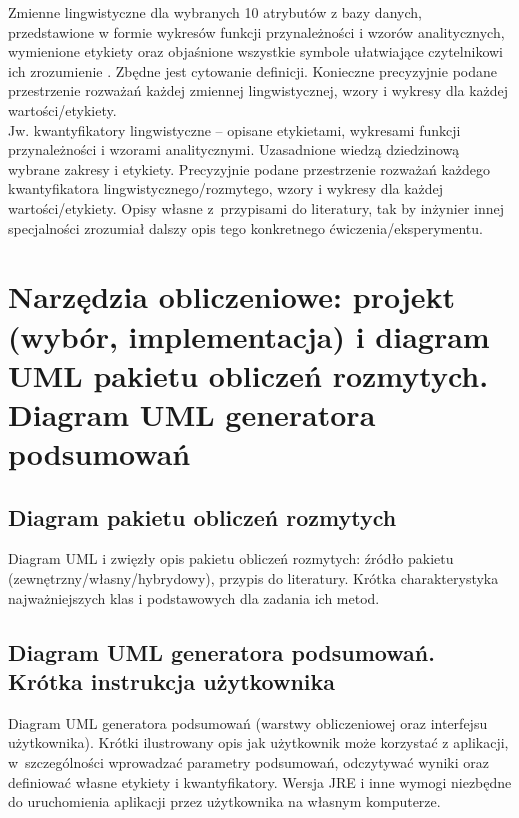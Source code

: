 \documentclass{classrep}
\begin{document}
Zmienne lingwistyczne dla wybranych 10 atrybutów z bazy danych, przedstawione w
formie wykresów funkcji przynależności i wzorów analitycznych, wymienione etykiety oraz objaśnione wszystkie
symbole ułatwiające czytelnikowi ich zrozumienie \cite{zadrozny06}. Zbędne jest
cytowanie definicji. Konieczne precyzyjnie podane przestrzenie rozważań każdej
zmiennej lingwistycznej, wzory i wykresy dla każdej wartości/etykiety.\\
Jw. kwantyfikatory lingwistyczne -- opisane etykietami, wykresami funkcji
przynależności i wzorami analitycznymi. Uzasadnione wiedzą dziedzinową wybrane
zakresy i etykiety. Precyzyjnie podane przestrzenie rozważań każdego kwantyfikatora 
lingwistycznego/rozmytego, wzory i wykresy dla każdej wartości/etykiety. Opisy własne z~przypisami do literatury, tak by inżynier innej specjalności zrozumiał dalszy
opis tego konkretnego ćwiczenia/eksperymentu. \\ 

\section{Narzędzia obliczeniowe: projekt (wybór, implementacja) i diagram UML pakietu obliczeń rozmytych. Diagram UML generatora podsumowań}
\subsection{Diagram pakietu obliczeń rozmytych}
Diagram UML i zwięzły opis pakietu obliczeń rozmytych: źródło pakietu
(zewnętrzny/własny/hybrydowy), przypis do literatury. Krótka charakterystyka
najważniejszych klas i podstawowych dla zadania ich metod. \\

\subsection{Diagram UML generatora podsumowań. Krótka instrukcja użytkownika} 
Diagram UML generatora podsumowań (warstwy obliczeniowej oraz interfejsu
użytkownika). Krótki ilustrowany opis jak użytkownik może korzystać z aplikacji, w~szczególności
wprowadzać parametry  podsumowań, odczytywać wyniki oraz definiować własne etykiety i
kwantyfikatory. Wersja JRE i inne wymogi niezbędne do uruchomienia aplikacji przez użytkownika na własnym komputerze. \\
\end{document}

